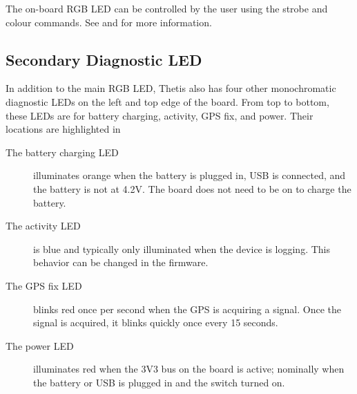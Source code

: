 The on-board \ac{RGB} \ac{LED} can be controlled by the user using the strobe and colour commands.  
See  and  for more information.

\subsection{Secondary Diagnostic \acs{LED}}
In addition to the main \ac{RGB} \ac{LED}, Thetis also has four other monochromatic diagnostic \acp{LED} on the left and top edge of the board.
From top to bottom, these \acp{LED} are for battery charging, activity, GPS fix, and power.
Their locations are highlighted in 


\begin{description}
    \item[The battery charging \ac{LED}] illuminates orange when the battery is plugged in, \ac{USB} is connected, and the battery is not at 4.2V. The board does not need to be on to charge the battery.
    \item[The activity \ac{LED}] is blue and typically only illuminated when the device is logging. This behavior can be changed in the firmware.   
    \item[The \acs{GPS} fix \ac{LED}] blinks red once per second when the GPS is acquiring a signal. Once the signal is acquired, it blinks quickly once every 15 seconds.
    \item[The power \ac{LED}] illuminates red when the 3V3 bus on the board is active; nominally when the battery or \ac{USB} is plugged in and the switch turned on.
\end{description}
